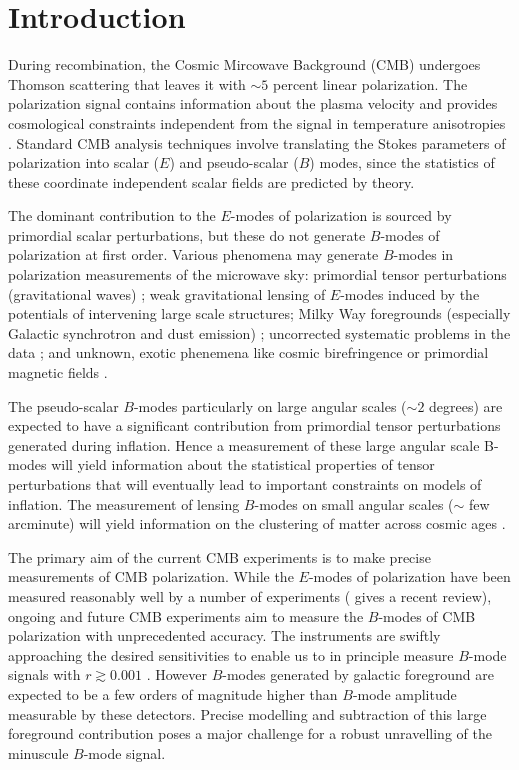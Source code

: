 \documentclass[a4paper,11pt]{article}
\begin{document}
\section{Introduction}
During recombination, the Cosmic Mircowave Background (CMB) undergoes Thomson scattering that leaves it with $\sim 5$ percent linear polarization.  The polarization signal contains information about the plasma velocity and provides cosmological constraints independent from the signal in temperature anisotropies \citep{1997NewA....2..323H}.  Standard CMB analysis techniques involve translating the Stokes parameters of polarization into scalar ($E$) and pseudo-scalar ($B$) modes, since the statistics of these coordinate independent scalar fields are predicted by theory.   

The dominant contribution to the $E$-modes of polarization is sourced by primordial scalar perturbations, but these do not generate $B$-modes of polarization at first order. Various phenomena may generate $B$-modes in polarization measurements of the microwave sky: primordial tensor perturbations (gravitational waves) \citep{1997PhRvD..56..596H,1997PhRvL..78.2054S}; weak gravitational lensing of $E$-modes induced by the potentials of intervening large scale structures;
Milky Way foregrounds (especially Galactic synchrotron and dust emission)
\citep{2016A&A...586A.133P}; uncorrected systematic problems in the data \citep{2003PhRvD..67d3004H,2008PhRvD..77h3003S}; and unknown, exotic phenemena like cosmic birefringence or primordial magnetic fields
\citep{1996ApJ...469....1K,1999PhRvL..83.1506L,2004ApJ...616....1C,2014MNRAS.438.2508P}.

The pseudo-scalar $B$-modes particularly on large angular scales ($\sim 2$ degrees) are expected to have a significant contribution from primordial tensor perturbations generated during inflation. Hence a measurement of these large angular scale B-modes will yield information about the statistical properties of tensor perturbations that will eventually lead to important constraints on models of inflation.  The measurement of lensing $B$-modes on small angular scales ($\sim$ few arcminute) will yield information on the clustering of matter across cosmic ages \citep{Abazajian2015, Kamionkowski2016,Abazajian2016,Hu2002c,Wehus2016}.
  
The primary aim of the current CMB experiments is to make precise measurements of CMB polarization. While the $E$-modes of polarization have been measured reasonably well by a number of experiments (\cite{2018RPPh...81d4901S} gives a recent review),  ongoing and future CMB experiments aim to measure the $B$-modes of CMB polarization with unprecedented accuracy. The instruments are swiftly approaching the desired sensitivities to enable us to in principle measure $B$-mode signals with $r\gtrsim 0.001$ \cite{Spider, CLASS,Litebird, BICEP22015, 2016arXiv161002743A, 2017arXiv170602464A,Delabrouille2017}. However $B$-modes generated by galactic foreground are expected to be a few orders of magnitude higher than $B$-mode amplitude measurable by these detectors.  Precise modelling and subtraction of this large foreground contribution poses a major challenge for a robust unravelling of the minuscule $B$-mode signal. 
 
\end{document}
